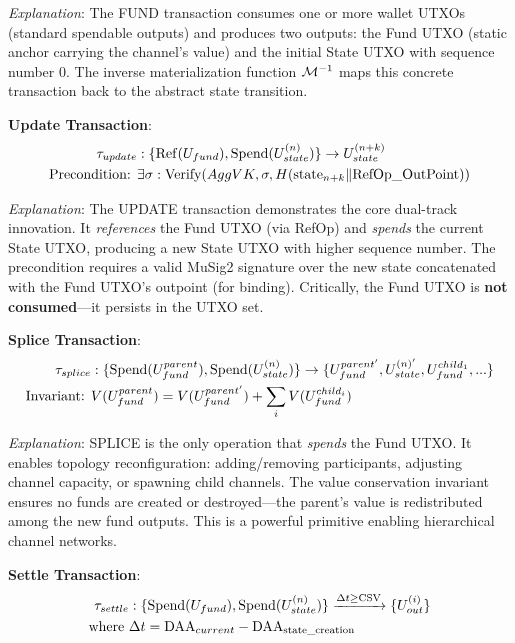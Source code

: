 \textit{Explanation}: The FUND transaction consumes one or more wallet UTXOs (standard spendable outputs) and produces two outputs: the Fund UTXO (static anchor carrying the channel's value) and the initial State UTXO with sequence number 0. The inverse materialization function $\mathcal{M}^{-1}$ maps this concrete transaction back to the abstract state transition.

\textbf{Update Transaction}:
\begin{align*}
\tau_{update}&: \{\operatorname{Ref}(U_{fund}), \operatorname{Spend}(U_{state}^{(n)})\} \to U_{state}^{(n+k)} \\
\text{Precondition: } &\exists \sigma: \text{Verify}(AggVK, \sigma, H(\text{state}_{n+k} \| \text{RefOp\_OutPoint}))
\end{align*}

\textit{Explanation}: The UPDATE transaction demonstrates the core dual-track innovation. It \textit{references} the Fund UTXO (via RefOp) and \textit{spends} the current State UTXO, producing a new State UTXO with higher sequence number. The precondition requires a valid MuSig2 signature over the new state concatenated with the Fund UTXO's outpoint (for binding). Critically, the Fund UTXO is \textbf{not consumed}---it persists in the UTXO set.

\textbf{Splice Transaction}:
\begin{align*}
\tau_{splice}&: \{\operatorname{Spend}(U_{fund}^{parent}), \operatorname{Spend}(U_{state}^{(n)})\} \to \{U_{fund}^{parent'}, U_{state}^{(n)'}, U_{fund}^{child_1}, ...\} \\
\text{Invariant: } &V(U_{fund}^{parent}) = V(U_{fund}^{parent'}) + \sum_i V(U_{fund}^{child_i})
\end{align*}

\textit{Explanation}: SPLICE is the only operation that \textit{spends} the Fund UTXO. It enables topology reconfiguration: adding/removing participants, adjusting channel capacity, or spawning child channels. The value conservation invariant ensures no funds are created or destroyed---the parent's value is redistributed among the new fund outputs. This is a powerful primitive enabling hierarchical channel networks.

\textbf{Settle Transaction}:
\begin{align*}
\tau_{settle}&: \{\operatorname{Spend}(U_{fund}), \operatorname{Spend}(U_{state}^{(n)})\} \xrightarrow{\Delta t \geq \text{CSV}} \{U_{out}^{(i)}\} \\
\text{where } &\Delta t = \text{DAA}_{current} - \text{DAA}_{\text{state\_creation}}
\end{align*}

